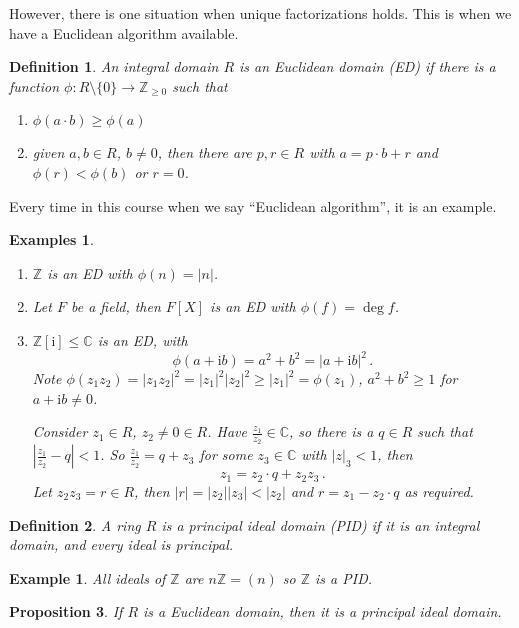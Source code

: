 \documentclass{article}
\theoremstyle{plain}\theoremheaderfont{\normalfont\itshape}\theorembodyfont{\rmfamily}\theoremseparator{.}\newtheorem*{rem}{Remark}\newtheorem*{ex}{Example}\newtheorem*{proof}{Proof}\newtheorem*{altp}{Alternative proof}\newtheorem*{nonex}{Non-Example}
\theoremstyle{plain}\theoremheaderfont{\normalfont\bfseries}\theorembodyfont{\rmfamily}\theoremseparator{.}\newtheorem{thm}{Theorem}[section]\newtheorem{lem}[thm]{Lemma}\newtheorem{prop}[thm]{Proposition}\newtheorem*{cor}{Corollary}\newtheorem{defn}[thm]{Definition}\newtheorem{clm}[thm]{Claim}\newtheorem{clminproof}{Claim}\newtheorem*{notn}{Notation}\newtheorem*{exer}{Exercise}\newtheorem*{lemnn}{Lemma}
\theoremstyle{break}\theoremheaderfont{\normalfont\itshape}\theorembodyfont{\rmfamily}\theoremseparator{.\medskip}\newtheorem*{proofskip}{Proof}\newtheorem*{exs}{Examples}\newtheorem*{rems}{Remarks}\newtheorem*{obs}{Observations}
\theoremstyle{break}\theoremheaderfont{\normalfont\bfseries}\theorembodyfont{\rmfamily}\theoremseparator{.\medskip}\newtheorem{lemskip}[thm]{Lemma}\newtheorem{defnskip}[thm]{Definition}\newtheorem{propskip}[thm]{Proposition}\newtheorem{thmskip}[thm]{Theorem}
\numberwithin{equation}{section}
\newcommand{\ii}{\mathrm{i}}
\newcommand{\abs}[1]{\left|#1\right|}
\newcommand{\ZZ}{\mathbb{Z}}
\newcommand{\CC}{\mathbb{C}}
\begin{document}
    However, there is one situation when unique factorizations holds. This is when we have a Euclidean algorithm available.
    \begin{defn}
        An integral domain \(R\) is an \textit{Euclidean domain} (ED) if there is a function \(\phi:R\setminus\{0\}\to\ZZ_{\ge 0}\) such that
        \begin{enumerate}[topsep=0pt,label=(\roman*)]
            \item \(\phi(a\cdot b)\ge \phi(a)\)
            \item given \(a,b\in R\), \(b\ne 0\), then there are \(p,r\in R\) with \(a=p\cdot b+r\) and \(\phi(r)<\phi(b)\) or \(r=0\).
        \end{enumerate}
    \end{defn}

    Every time in this course when we say ``Euclidean algorithm'', it is an example.
    \begin{exs}
        \begin{enumerate}[topsep=0pt,label=(\roman*)]
            \item \(\ZZ\) is an ED with \(\phi(n)=\abs{n}\).
            \item Let \(F\) be a field, then \(F[X]\) is an ED with \(\phi(f)=\deg f\).
            \item \(\ZZ[\ii]\le\CC\) is an ED, with
            \[\phi(a+\ii b)=a^2+b^2=\abs{a+\ii b}^2\,.\]
            Note \(\phi(z_1z_2)=\abs{z_1z_2}^2=\abs{z_1}^2\abs{z_2}^2\ge\abs{z_1}^2=\phi(z_1)\), \(a^2+b^2\ge 1\) for \(a+\ii b\ne 0\).

            Consider \(z_1\in R\), \(z_2\ne 0\in R\). Have \(\frac{z_1}{z_2}\in\CC\), so there is a \(q\in R\) such that \(\abs{\frac{z_1}{z_2}-q}<1\). So \(\frac{z_1}{z_2}=q+z_3\) for some \(z_3\in\CC\) with \(\abs{z}_3<1\), then
            \[z_1=z_2\cdot q+z_2z_3\,.\]
            Let \(z_2z_3=r\in R\), then \(\abs{r}=\abs{z_2}\abs{z_3}<\abs{z_2}\) and \(r=z_1-z_2\cdot q\) as required.
        \end{enumerate}
    \end{exs}
    \begin{defn}
        A ring \(R\) is a \textit{principal ideal domain} (PID) if it is an integral domain, and every ideal is principal.
    \end{defn}
    \begin{ex}
        All ideals of \(\ZZ\) are \(n\ZZ=(n)\) so \(\ZZ\) is a PID.
    \end{ex}
    \begin{prop}
        If \(R\) is a Euclidean domain, then it is a principal ideal domain.
    \end{prop}
\end{document}
